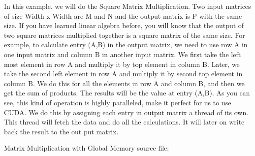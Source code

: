 \documentclass[letterpaper,10pt,english]{sphinxmanual}
\begin{document}
In this example, we will do the Square Matrix Multiplication. Two input matrices of size Width x Width are M and N and the output matrix is P with the same size. If you have learned linear algebra before, you will know that the output of two square matrices multiplied together is a square matrix of the same size. For example, to calculate entry (A,B) in the output matrix, we need to use row A in one input matrix and column B in another input matrix. We first take the left most element in row A and multiply it by top element in column B. Later, we take the second left element in row A and multiply it by second top element in column B. We do this for all the elements in row A and column B, and then we get the sum of products. The results will be the value at entry (A,B). As you can see, this kind of operation is highly paralleled, make it perfect for us to use CUDA. We do this by assigning each entry in output matrix a thread of its own. This thread will fetch the data and do all the calculations. It will later on write back the result to the out put matrix.

Matrix Multiplication with Global Memory source file:
\end{document}
